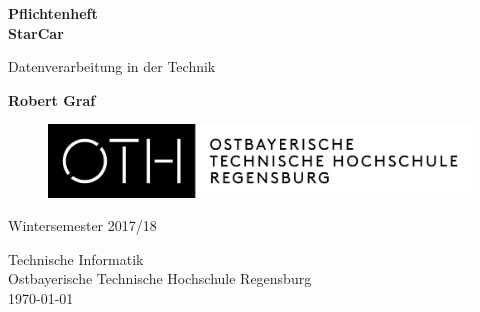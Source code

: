 \begin{titlepage}
    \begin{center}
        \vspace{1cm}
        
        \Huge
        \textbf{Pflichtenheft} \\		  \textbf{StarCar}
        
        \vspace{0.5cm}
        \LARGE
        Datenverarbeitung in der Technik
       
        \vspace{3cm}
        
        \textbf{Robert Graf}
        
        \vspace{1.7cm}
        
        \begin{figure}
			\centering
			\includegraphics[width=0.7\linewidth]{OTHLogo.jpg}
			\label{pic:OTHLogo}
		\end{figure}

       
        \vfill
        
        Wintersemester 2017/18
        
        \vspace{0.8cm}
          \Large
        Technische Informatik\\
        Ostbayerische Technische Hochschule Regensburg\\
       \today
        
    \end{center}
\end{titlepage}
